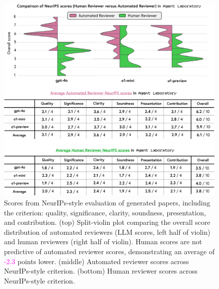 \documentclass[11pt, a4paper]{gdm_format}
\begin{document}
\begin{figure}
    \centering
    \includegraphics[width=0.99\linewidth]{images/pngs/scores.png}
    \caption{Scores from NeurIPs-style evaluation of generated papers, including the criterion: quality, significance, clarity, soundness, presentation, and contribution. (top) Split-violin plot comparing the overall score distribution of automated reviewers (LLM scores, left half of violin) and human reviewers (right half of violin). Human scores are not predictive of automated reviewer scores, demonstrating an average of \textcolor{Magenta}{-2.3} points lower. (middle) Automated reviewer scores across NeurIPs-style criterion. (bottom) Human reviewer scores across NeurIPs-style criterion.}
    \label{fig:humanscores}
\end{figure}

\end{document}
